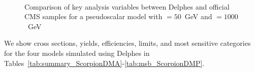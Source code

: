 \begin{figure}
    \begin{center}
         ~~
         ~~
         ~~
        \caption{Comparison of key analysis variables between Delphes and official CMS samples for a pseudoscalar model with \mchi$=50$~GeV and \mphi$=1000$~GeV}
        \label{fig:delphesVSofficial}
    \end{center}
\end{figure}

We show cross sections, yields, efficiencies, limits, and most sensitive 
categories for the four models simulated using Delphes in 
Tables~\ref{tab:summary_ScorpionDMA}-\ref{tab:msb_ScorpionDMP}.

%





